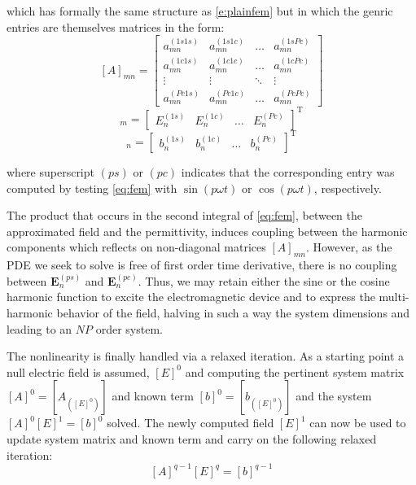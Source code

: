 \documentclass[journal]{IEEEtran}
\renewcommand{\vec}[1]{\mathbf{#1}}
\begin{document}
\noindent which has formally the same structure as \eqref{e:plainfem} but in
which the genric entries are themselves matrices in the form:
%
\begin{equation}\label{e:HBfemmn}
[A]_{mn}=
\begin{bmatrix}
a_{mn}^{(1s1s)} & a_{mn}^{(1s1c)} & \ldots &  a_{mn}^{(1sPc)} \\
a_{mn}^{(1c1s)} & a_{mn}^{(1c1c)} & \ldots &  a_{mn}^{(1cPc)} \\
\vdots & \vdots & \ddots & \vdots \\
a_{mn}^{(Pc1s)} & a_{mn}^{(Pc1c)} & \ldots &  a_{mn}^{(PcPc)}
\end{bmatrix}
\end{equation}
\begin{equation} 
[E]_m = 
\begin{bmatrix}
E_{n}^{(1s)} &
E_{n}^{(1c)} &
\ldots &
E_{n}^{(Pc)}
\end{bmatrix}^\text{T}
\end{equation}
\begin{equation} 
[b]_n = 
\begin{bmatrix}
b_{n}^{(1s)} &
b_{n}^{(1c)} &
\ldots &
b_{n}^{(Pc)}
\end{bmatrix}^\text{T}
\end{equation}

\indent where superscript $(ps)$ or $(pc)$ indicates that the corresponding
entry was computed by testing \eqref{eq:fem} with $\sin(p \omega t)$ or
$\cos(p \omega t)$, respectively.

The product that occurs in the second integral of \eqref{eq:fem}, between the
approximated field and the permittivity, induces coupling between the harmonic
components which reflects on non-diagonal matrices $[A]_{mn}$. However, as the
PDE we seek to solve is free of first order time derivative, there is no 
coupling between $\vec{E}_{n}^{(ps)}$ and $\vec{E}_{n}^{(pc)}$. Thus, we may
retain either the sine or the cosine harmonic function to excite the
electromagnetic device and to express the multi-harmonic behavior of the field,
halving in such a way the system dimensions and leading to an $NP$ order
system.

The nonlinearity is finally handled via a
relaxed iteration. As a starting point a null electric field is assumed,
$[E]^0$ and computing the pertinent system matrix $[A]^0=[A_{([E]^0)}]$ and
known term $[b]^0=[b_{([E]^0)}]$ and the system $[A]^0 [E]^1 =
[b]^0$ solved. The newly computed field $[E]^1$ can now be used to update system
matrix and known term and carry on the following relaxed iteration:
%
\begin{equation} \label{eq:lastLinearSystem}
[A]^{q-1} [E]^{q} = [b]^{q-1}
\end{equation}
\end{document}
